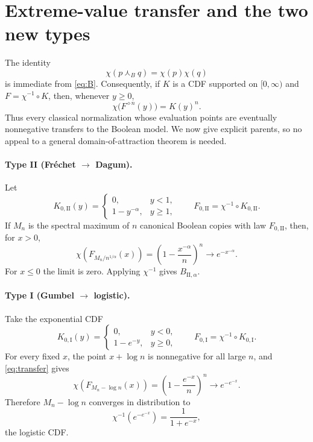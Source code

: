 \documentclass[11pt]{article}
\newcommand{\Bmeet}{\mathbin{\curlywedge_{\!B}}}
\begin{document}
\section{Extreme-value transfer and the two new types}

The identity
\begin{equation}\label{eq:chi}
 \chi(p\Bmeet q)=\chi(p)\chi(q)
\end{equation}
is immediate from \eqref{eq:B}.  Consequently, if $K$ is a CDF supported on
$[0,\infty)$ and $F=\chi^{-1}\circ K$, then, whenever $y\geq0$,
\begin{equation}\label{eq:transfer}
 \chi\bigl(F^{\diamond n}(y)\bigr)=K(y)^n.
\end{equation}
Thus every classical normalization whose evaluation points are eventually
nonnegative transfers to the Boolean model.  We now give explicit parents,
so no appeal to a general domain-of-attraction theorem is needed.

\paragraph{Type II (Fr\'echet $\longrightarrow$ Dagum).}
Let
\[
K_{0,\mathrm{II}}(y)=
\begin{cases}0,&y<1,\\1-y^{-\alpha},&y\geq1,
\end{cases}
\qquad F_{0,\mathrm{II}}=\chi^{-1}\circ K_{0,\mathrm{II}}.
\]
If $M_n$ is the spectral maximum of $n$ canonical Boolean copies with law
$F_{0,\mathrm{II}}$, then, for $x>0$,
\[
\chi\!\left(F_{M_n/n^{1/\alpha}}(x)\right)
=\left(1-\frac{x^{-\alpha}}n\right)^n
\longrightarrow e^{-x^{-\alpha}}.
\]
For $x\leq0$ the limit is zero.  Applying $\chi^{-1}$ gives
$B_{\mathrm{II},\alpha}$.

\paragraph{Type I (Gumbel $\longrightarrow$ logistic).}
Take the exponential CDF
\[
K_{0,\mathrm I}(y)=\begin{cases}0,&y<0,\\1-e^{-y},&y\geq0,
\end{cases}
\qquad F_{0,\mathrm I}=\chi^{-1}\circ K_{0,\mathrm I}.
\]
For every fixed $x$, the point $x+\log n$ is nonnegative for all large $n$,
and \eqref{eq:transfer} gives
\[
\chi\!\left(F_{M_n-\log n}(x)\right)
=\left(1-\frac{e^{-x}}n\right)^n
\longrightarrow e^{-e^{-x}}.
\]
Therefore $M_n-\log n$ converges in distribution to
\[
\chi^{-1}(e^{-e^{-x}})=\frac1{1+e^{-x}},
\]
the logistic CDF.
\end{document}
